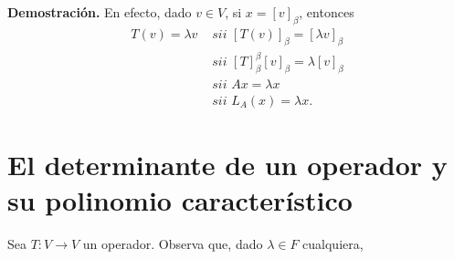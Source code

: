 \noindent
\textbf{Demostración.}
En efecto, dado $v \in V$, si $x = [v]_{\beta}$, entonces
\begin{align*}
T(v) = \lambda v & \textit{ sii } [T(v)]_{\beta} = [\lambda v]_{\beta} \\
& \textit{ sii } [T]_{\beta}^{\beta} [v]_{\beta} = \lambda [v]_{\beta} \\
& \textit{ sii } A x = \lambda x \\
& \textit{ sii } L_{A}(x) = \lambda x.
\end{align*}
\QEDB
\vspace{0.2cm}


\section{El determinante de un operador y su polinomio característico}

Sea $T: V \longrightarrow V$ un operador. Observa que,
dado $\lambda \in F$ cualquiera,

